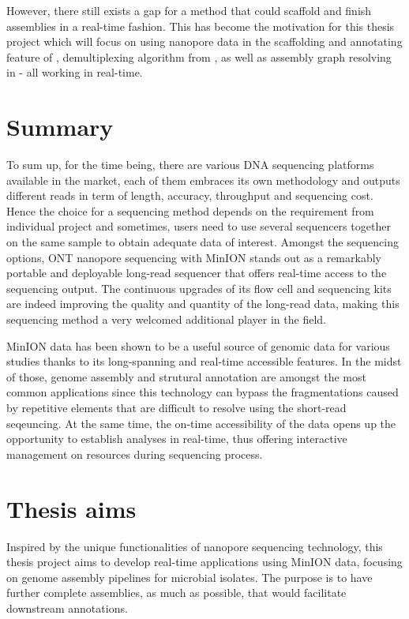However, there still exists a gap for a method that could scaffold and finish assemblies in a real-time fashion.  %
This has become the motivation for this thesis project which will focus on using nanopore data in the scaffolding and annotating feature of \npscarf{}, demultiplexing algorithm from \npbarcode{}, as well as assembly graph resolving in \npgraph{} - all working in real-time.

\section{Summary}
To sum up, for the time being, there are various DNA sequencing platforms available in the market, each of them embraces its own methodology and outputs different reads in term of length, accuracy, throughput and sequencing cost. Hence the choice for a sequencing method depends on the requirement from individual project and sometimes, users need to use several sequencers together on the same sample to obtain adequate data of interest. 
Amongst the sequencing options, ONT nanopore sequencing with MinION stands out as a remarkably portable and deployable long-read sequencer that offers real-time access to the sequencing output. The continuous upgrades of its flow cell and sequencing kits are indeed improving the quality and quantity of the long-read data, making this sequencing method a very welcomed additional player in the field.

MinION data has been shown to be a useful source of genomic data for various  studies thanks to its long-spanning and real-time accessible features. In the midst of those, genome assembly and strutural annotation are amongst the most common applications since this technology can bypass the fragmentations caused by repetitive elements that are difficult to resolve using the short-read seqeuncing. At the same time, the on-time accessibility of the data opens up the opportunity to establish  analyses in real-time, thus offering interactive management on resources during sequencing process.
\section{Thesis aims}
Inspired by the unique functionalities of nanopore sequencing technology, this thesis project aims to  develop real-time applications using MinION data, focusing on genome assembly pipelines for microbial isolates. The purpose is to have further complete assemblies, as much as possible, that would facilitate downstream annotations.

